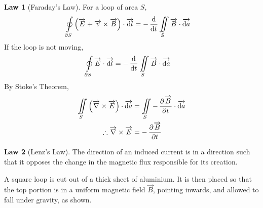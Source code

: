 \documentclass[fleqn, a4paper, 8pt, twoside]{amsart}
\theoremstyle{definition}
\theoremstyle{theorem}
\newtheorem{law}{Law}
\begin{document}
\begin{multicols}{2}
\begin{spacing}{0.6}
\begin{law}[Faraday's Law]
	For a loop of area $S$,
	\begin{align*}
		\oint\limits_{\partial S} \left( \overrightarrow{E} + \overrightarrow{v} \times \overrightarrow{B} \right) \cdot \overrightarrow{\dif l} & = -\dod{}{t} \iint\limits_{S} \overrightarrow{B} \cdot \overrightarrow{\dif a}
	\end{align*}
	If the loop is not moving,
	\begin{align*}
		\oint\limits_{\partial S} \overrightarrow{E} \cdot \overrightarrow{\dif l} & = -\dod{}{t} \iint\limits_{S} \overrightarrow{B} \cdot \overrightarrow{\dif a}
	\end{align*}
	By Stoke's Theorem,
	\begin{align*}
		\iint\limits_{S} \left( \overrightarrow{\nabla} \times \overrightarrow{E} \right) \cdot \overrightarrow{\dif a} & = \iint\limits_{S} -\dpd{\overrightarrow{B}}{t} \cdot \overrightarrow{\dif a} \\
		\therefore \overrightarrow{\nabla} \times \overrightarrow{E}                                                    & = -\dpd{\overrightarrow{B}}{t}
	\end{align*}
	\label{Faraday's_Law}
\end{law}

\begin{law}[Lenz's Law]
	The direction of an induced current is in a direction such that it opposes the change in the magnetic flux responsible for its creation.
	\label{Lenz's_Law}
\end{law}

\begin{question}
	A square loop is cut out of a thick sheet of aluminium.
	It is then placed so that the top portion is in a uniform magnetic field $\overrightarrow{B}$, pointing inwards, and allowed to fall under gravity, as shown.
	\begin{figure}[H]
\end{figure}
\end{question}
\end{spacing}
\end{multicols}
\end{document}
